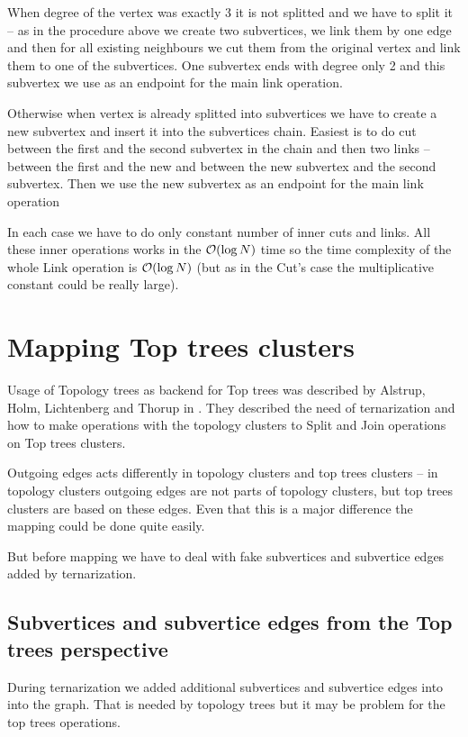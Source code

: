 When degree of the vertex was exactly 3 it is not splitted and we have to split
it -- as in the procedure above we create two subvertices, we link them by one
edge and then for all existing neighbours we cut them from the original vertex
and link them to one of the subvertices. One subvertex ends with degree only
2 and this subvertex we use as an endpoint for the main link operation.

Otherwise when vertex is already splitted into subvertices we have to create
a new subvertex and insert it into the subvertices chain. Easiest is to do cut
between the first and the second subvertex in the chain and then two links --
between the first and the new and between the new subvertex and the second subvertex.
Then we use the new subvertex as an endpoint for the main link operation

In each case we have to do only constant number of inner cuts and links. All
these inner operations works in the ${\cal O}(\log N)$ time so the time complexity of
the whole Link operation is ${\cal O}(\log N)$ (but as in the Cut's case the
multiplicative constant could be really large).

\section{Mapping Top trees clusters}

Usage of Topology trees as backend for Top trees was described by Alstrup, Holm,
Lichtenberg and Thorup in \cite{TopTrees}. They described the need of
ternarization and how to make operations with the topology clusters to Split and
Join operations on Top trees clusters.

Outgoing edges acts differently in topology clusters and top trees clusters --
in topology clusters outgoing edges are not parts of topology clusters, but
top trees clusters are based on these edges. Even that this is a major
difference the mapping could be done quite easily.

But before mapping we have to deal with fake subvertices and subvertice edges
added by ternarization.

\subsection{Subvertices and subvertice edges from the Top trees perspective}

During ternarization we added additional subvertices and subvertice edges
into into the graph. That is needed by topology trees but it may be problem for
the top trees operations.

